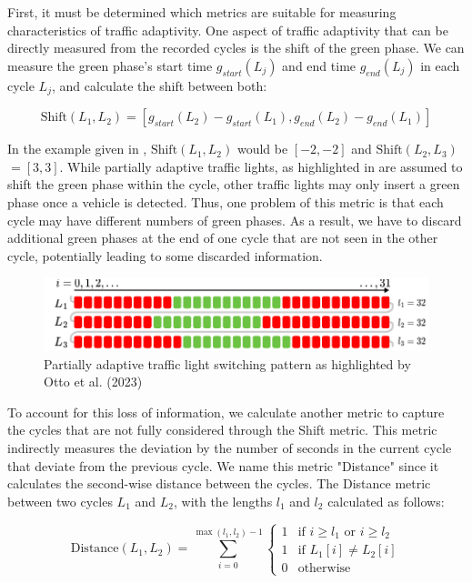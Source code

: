 First, it must be determined which metrics are suitable for measuring characteristics of traffic adaptivity. One aspect of traffic adaptivity that can be directly measured from the recorded cycles is the shift of the green phase. We can measure the green phase's start time $g_{start}(L_j)$ and end time $g_{end}(L_j)$ in each cycle $L_j$, and calculate the shift between both:

\[ \text{Shift}(L_1, L_2) = [g_{start}(L_2) - g_{start}(L_1), g_{end}(L_2) - g_{end}(L_1)] \]

In the example given in , $\text{Shift}$$(L_1, L_2)$ would be $[-2, -2]$ and $\text{Shift}$$(L_2, L_3) $$= [3, 3]$. While partially adaptive traffic lights, as highlighted in  are assumed to shift the green phase within the cycle, other traffic lights may only insert a green phase once a vehicle is detected. Thus, one problem of this metric is that each cycle may have different numbers of green phases. As a result, we have to discard additional green phases at the end of one cycle that are not seen in the other cycle, potentially leading to some discarded information. 

\begin{figure}[t]
    \centering
    \includegraphics[width=0.75\linewidth]{images/explanation-partially-adaptive.pdf}
    \caption{Partially adaptive traffic light switching pattern as highlighted by Otto et al. (2023) \cite{otto_framework_2023}}\label{fig:types-of-adaptiveness}
\end{figure}

To account for this loss of information, we calculate another metric to capture the cycles that are not fully considered through the Shift metric. This metric indirectly measures the deviation by the number of seconds in the current cycle that deviate from the previous cycle. We name this metric "Distance" since it calculates the second-wise distance between the cycles. The Distance metric between two cycles $L_1$ and $L_2$, with the lengths $l_1$ and $l_2$ calculated as follows:

\[ \text{Distance}(L_1, L_2) =  \sum_{i=0}^{\max(l_1, l_2)-1} \left\{
\begin{array}{ll}
1 & \text{if } i \geq l_1 \text{ or } i \geq l_2 \\
1 & \text{if } L_1[i] \neq L_2[i] \\
0 & \text{otherwise}
\end{array} \right.\]

